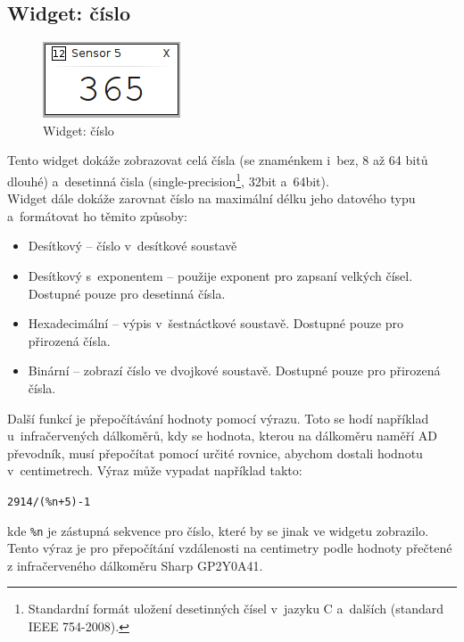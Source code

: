 \documentclass[12pt, a4paper, oneside]{article}
\begin{document}
\subsection{Widget: číslo}
\begin{figure}[H]
\begin{center}
\includegraphics[scale=1]{img/w_num.png}
\caption{Widget: číslo}
\end{center}
\end{figure}
Tento widget dokáže zobrazovat celá čísla (se znaménkem i~bez, 8 až 64 bitů dlouhé) a~desetinná čisla (single-precision\footnote{Standardní formát uložení desetinných čísel v~jazyku C a~dalších (standard IEEE 754-2008).}, 32bit a~64bit).\\
Widget dále dokáže zarovnat číslo na maximální délku jeho datového typu\\a~formátovat ho těmito způsoby:
\begin{itemize}
    \item Desítkový -- číslo v~desítkové soustavě
    \item Desítkový s~exponentem -- použije exponent pro zapsaní velkých čísel. Dostupné pouze pro desetinná čísla.
    \item Hexadecimální -- výpis v~šestnáctkové soustavě. Dostupné pouze pro přirozená čísla. 
    \item Binární -- zobrazí číslo ve dvojkové soustavě.  Dostupné pouze pro přirozená čísla.
\end{itemize}

Další funkcí je přepočítávání hodnoty pomocí výrazu. Toto se hodí například u~infračervených dálkoměrů, kdy se hodnota, kterou na dálkoměru naměří AD převodník, musí přepočítat pomocí určité rovnice, abychom dostali hodnotu v~centimetrech. Výraz může vypadat například takto:
\begin{center}
\verb|2914/(%n+5)-1|
\end{center}
kde \verb|%n| je zástupná sekvence pro číslo, které by se jinak ve widgetu zobrazilo. Tento výraz je pro přepočítání vzdálenosti na centimetry podle hodnoty přečtené z infračerveného dálkoměru Sharp GP2Y0A41.
\end{document}
